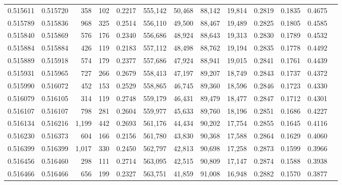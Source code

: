 \begin{tabular}{rrrrrrrrrrrrr}
0.515611 & 0.515720 &   358 &   102 &                                     0.2217 & 555,142 &  50,468 &  88,142 &  19,814 & 0.2819 & 0.1835 & 0.4675 \\
0.515789 & 0.515836 &   968 &   325 &                                     0.2514 & 556,110 &  49,500 &  88,467 &  19,489 & 0.2825 & 0.1805 & 0.4585 \\
0.515840 & 0.515869 &   576 &   176 &                                     0.2340 & 556,686 &  48,924 &  88,643 &  19,313 & 0.2830 & 0.1789 & 0.4532 \\
0.515884 & 0.515884 &   426 &   119 &                                     0.2183 & 557,112 &  48,498 &  88,762 &  19,194 & 0.2835 & 0.1778 & 0.4492 \\
0.515889 & 0.515918 &   574 &   179 &                                     0.2377 & 557,686 &  47,924 &  88,941 &  19,015 & 0.2841 & 0.1761 & 0.4439 \\
0.515931 & 0.515965 &   727 &   266 &                                     0.2679 & 558,413 &  47,197 &  89,207 &  18,749 & 0.2843 & 0.1737 & 0.4372 \\
0.515990 & 0.516072 &   452 &   153 &                                     0.2529 & 558,865 &  46,745 &  89,360 &  18,596 & 0.2846 & 0.1723 & 0.4330 \\
0.516079 & 0.516105 &   314 &   119 &                                     0.2748 & 559,179 &  46,431 &  89,479 &  18,477 & 0.2847 & 0.1712 & 0.4301 \\
0.516107 & 0.516107 &   798 &   281 &                                     0.2604 & 559,977 &  45,633 &  89,760 &  18,196 & 0.2851 & 0.1686 & 0.4227 \\
0.516134 & 0.516216 & 1,199 &   442 &                                     0.2693 & 561,176 &  44,434 &  90,202 &  17,754 & 0.2855 & 0.1645 & 0.4116 \\
0.516230 & 0.516373 &   604 &   166 &                                     0.2156 & 561,780 &  43,830 &  90,368 &  17,588 & 0.2864 & 0.1629 & 0.4060 \\
0.516399 & 0.516399 & 1,017 &   330 &                                     0.2450 & 562,797 &  42,813 &  90,698 &  17,258 & 0.2873 & 0.1599 & 0.3966 \\
0.516456 & 0.516460 &   298 &   111 &                                     0.2714 & 563,095 &  42,515 &  90,809 &  17,147 & 0.2874 & 0.1588 & 0.3938 \\
0.516466 & 0.516466 &   656 &   199 &                                     0.2327 & 563,751 &  41,859 &  91,008 &  16,948 & 0.2882 & 0.1570 & 0.3877 \\

\end{tabular}
